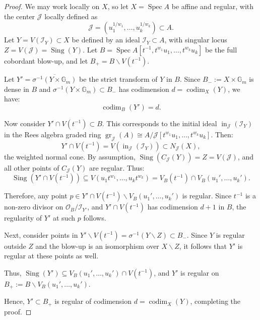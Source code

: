 \documentclass{amsart}
\newcommand{\cI}{{\mathcal I}}
\newcommand{\cJ}{{\mathcal J}}
\newcommand{\cO}{{\mathcal O}}
\newcommand{\inn}{\operatorname{in}}
\newcommand{\Spec}{\operatorname{Spec}}
\newcommand{\Sing}{{\operatorname{Sing}}}
\newcommand{\codim}{\operatorname{codim}}
\renewcommand{\setminus}{\smallsetminus}
\newcommand{\gr}{{\operatorname{gr}}}
\begin{document}
\begin{proof}
We may work locally on $X$, so let $X = \Spec A$ be affine and regular, with the center $\cJ$ locally defined as
\[
\cJ = (u_1^{1/w_1}, \ldots, u_k^{1/w_k}) \subset A.
\]
Let $Y = V(\cI_Y) \subset X$ be defined by an ideal $\cI_Y \subset A$, with singular locus $Z = V(\cJ) = \Sing(Y)$. Let $B = \Spec A[t^{-1}, t^{w_1}u_1, \ldots, t^{w_k}u_k]$ be the full cobordant blow-up, and let $B_+ = B \setminus V(t^{-1})$.

Let $Y' = \overline{\sigma^{-1}(Y \times \mathbb{G}_m)}$ be the strict transform of $Y$ in $B$. Since $B_- := X \times \mathbb{G}_m$ is dense in $B$ and $\sigma^{-1}(Y \times \mathbb{G}_m) \subset B_-$ has codimension $d = \codim_X(Y)$, we have:
\[
\codim_B(Y') = d.
\]

Now consider $Y' \cap V(t^{-1}) \subset B$. This corresponds to the initial ideal $\inn_{\cJ}(\cI_Y)$ in the Rees algebra graded ring $\gr_{\cJ}(A) \cong A / \cJ[t^{w_1}u_1, \ldots, t^{w_k}u_k]$. Then:
\[
Y' \cap V(t^{-1}) = V(\inn_{\cJ}(\cI_Y)) \subset N_{\cJ}(X),
\]
the weighted normal cone. By assumption, $\Sing(C_{\cJ}(Y)) = Z = V(\cJ)$, and all other points of $C_{\cJ}(Y)$ are regular. Thus:
\[
\Sing(Y' \cap V(t^{-1})) \subseteq V(u_1t^{w_1}, \ldots, u_kt^{w_k}) = V_B(t^{-1}) \cap V_B(u_1', \ldots, u_k').
\]

Therefore, any point $p \in Y' \cap V(t^{-1}) \setminus V_B(u_1', \ldots, u_k')$ is regular. Since $t^{-1}$ is a non-zero divisor on $\cO_B/\cI_{Y'}$, and $Y' \cap V(t^{-1})$ has codimension $d+1$ in $B$, the regularity of $Y'$ at such $p$ follows.

Next, consider points in $Y' \setminus V(t^{-1}) = \sigma^{-1}(Y \setminus Z) \subset B_-$. Since $Y$ is regular outside $Z$ and the blow-up is an isomorphism over $X \setminus Z$, it follows that $Y'$ is regular at these points as well.

Thus, $\Sing(Y') \subseteq V_B(u_1', \ldots, u_k') \cap V(t^{-1})$, and $Y'$ is regular on $B_+ := B \setminus V_B(u_1', \ldots, u_k')$.

Hence, $Y' \subset B_+$ is regular of codimension $d = \codim_X(Y)$, completing the proof.
\end{proof}
\end{document}
